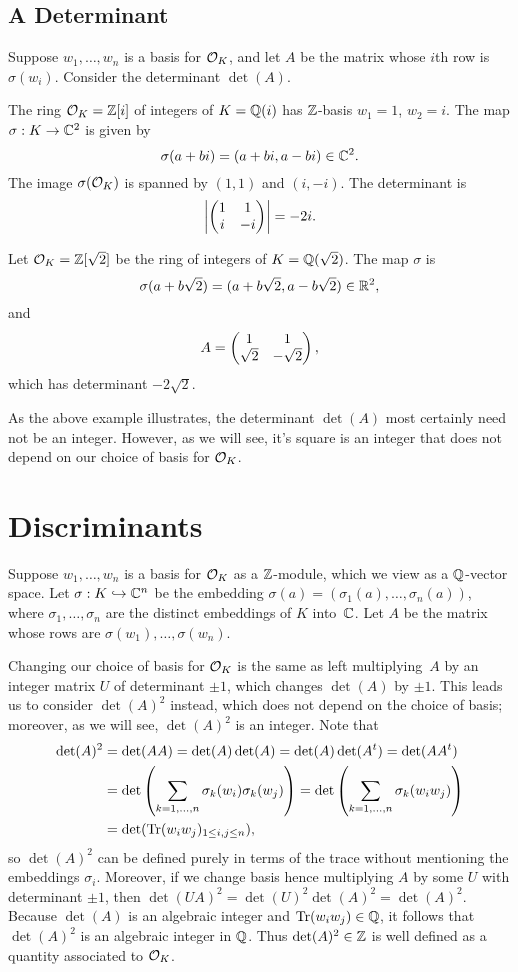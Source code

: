 \subsection{A Determinant}
 Suppose $w_1,\ldots, w_n$ is a basis for
$\mathcal{O}_K$, and let $A$ be the matrix whose $i$th row is $\sigma(w_i)$.
Consider the determinant $\det(A)$.
\begin{example}
The ring $\mathcal{O}_K=\mathbb{Z}[i]$ of integers of $K=\mathbb{Q}(i)$
has $\mathbb{Z}$-basis $w_1=1$, $w_2=i$.
The map $\sigma:K\to \mathbb{C}^2$ is given by
$$
   \sigma(a+bi) = (a+bi,a-bi)\in\mathbb{C}^2.
$$
The image $\sigma(\mathcal{O}_K)$ is spanned by
$(1,1)$ and $(i,-i)$.
The determinant is
\[
  \left|\left( \begin{matrix}1&1\\i&-i \end{matrix}\right)\right| = -2i.
\]

Let $\mathcal{O}_K=\mathbb{Z}[\sqrt{2}]$ be the ring of integers of $K=\mathbb{Q}(\sqrt{2})$.
The map $\sigma$ is
\[
  \sigma(a+b\sqrt{2}) = (a+b\sqrt{2},a-b\sqrt{2})\in\mathbb{R}^2,
\]
and
\[
A = \left( \begin{matrix}1&1\\\sqrt{2}&-\sqrt{2} \end{matrix}\right),
\]
which has determinant
$ -2\sqrt{2}$.
\end{example}
As the above example illustrates, the determinant $\det(A)$ most
certainly need not be an integer.  However, as we will see, it's
square is an integer that does not depend on our choice of
basis for $\mathcal{O}_K$.

\section{Discriminants}\label{sec:disc}
Suppose $w_1,\ldots, w_n$ is a basis for $\mathcal{O}_K$ as a $\mathbb{Z}$-module,
which we view as a $\mathbb{Q}$-vector space.  Let $ \sigma : K\hookrightarrow \mathbb{C}^n $ be
the embedding $\sigma(a)=(\sigma_1(a),\ldots,\sigma_n(a))$, where
$\sigma_1,\ldots, \sigma_n$ are the distinct embeddings of $K$
into~$\mathbb{C}$.  Let $A$ be the matrix whose rows are $\sigma(w_1), \ldots,
\sigma(w_n)$.

Changing our choice of
basis for $\mathcal{O}_K$ is the same as left multiplying~$A$ by an integer
matrix $U$ of determinant $\pm 1$, which changes
$\det(A)$ by $\pm 1$.
This leads us to consider $\det(A)^2$ instead, which does not depend
on the choice of basis; moreover, as we will see, $\det(A)^2$ is an integer.
Note that
\begin{align*}
\det(A)^2 &= \det(AA) =
\det(A)\det(A)=\det(A)\det(A^t)=
\det(A A^t) \\
 &= \det\left(\sum_{k=1,\ldots,n} \sigma_k(w_i)\sigma_k(w_j)\right)
 = \det\left(\sum_{k=1,\ldots,n} \sigma_k(w_i w_j)\right)\\
 &= \det(\operatorname{Tr}(w_i w_j)_{1\leq i,j\leq n}),
\end{align*}
so $\det(A)^2$ can be defined purely in terms of the trace without
mentioning the embeddings $\sigma_i$.
Moreover, if we change basis hence multiplying $A$ by some $U$ with determinant $\pm 1$, then
$\det(UA)^2 = \det(U)^2\det(A)^2 = \det(A)^2$.
Because $\det(A)$ is an algebraic integer and $\operatorname{Tr}(w_iw_j)\in\mathbb{Q}$, it follows
that $\det(A)^2$ is an algebraic integer in $\mathbb{Q}$.
Thus $\det(A)^2\in \mathbb{Z}$ is well defined as a quantity associated to $\mathcal{O}_K$.

